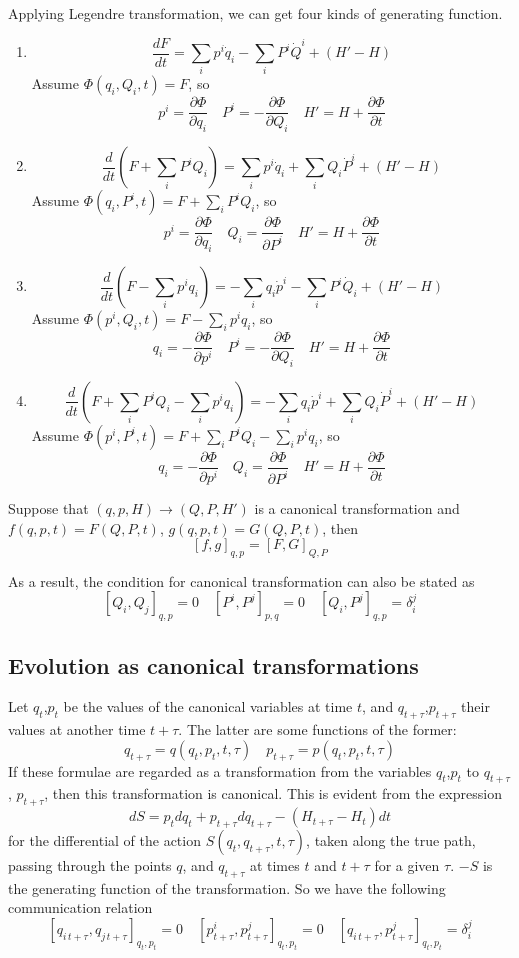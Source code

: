 \documentclass[cyan]{elegantnote}
\begin{document}
Applying Legendre transformation, we can get four kinds of generating function. 
\begin{enumerate}
\item \[\frac{dF}{dt} = \sum_i p^i \dot{q}_i - \sum_i P^i \dot{Q}^i + (H'-H)\]
Assume $\Phi(q_i,Q_i,t) = F$, so
\[p^i = \frac{\partial \Phi}{\partial q_i} \quad P^i = -\frac{\partial \Phi}{\partial Q_i} \quad H' = H + \frac{\partial \Phi}{\partial t}\]

\item \[\frac{d}{dt}(F+\sum_i P^i Q_i) = \sum_i p^i \dot{q}_i + \sum_i Q_i \dot{P}^i + (H'-H)\]
Assume $\Phi(q_i,P^i,t) = F + \sum_i P^i Q_i$, so
\[p^i = \frac{\partial \Phi}{\partial q_i} \quad Q_i = \frac{\partial \Phi}{\partial P^i} \quad H' = H + \frac{\partial \Phi}{\partial t}\]

\item \[\frac{d}{dt}(F-\sum_i p^i q_i) = -\sum_i q_i \dot{p}^i - \sum_i P^i \dot{Q}_i + (H'-H)\]
Assume $\Phi(p^i,Q_i,t) = F - \sum_i p^i q_i$, so
\[q_i = -\frac{\partial \Phi}{\partial p^i} \quad P^i = -\frac{\partial \Phi}{\partial Q_i} \quad H' = H + \frac{\partial \Phi}{\partial t}\]

\item \[\frac{d}{dt}(F+\sum_i P^i Q_i-\sum_i p^i q_i) = -\sum_i q_i \dot{p}^i + \sum_i Q_i \dot{P}^i + (H'-H)\]
Assume $\Phi(p^i,P^i,t) = F+\sum_i P^i Q_i-\sum_i p^i q_i$, so
\[q_i = -\frac{\partial \Phi}{\partial p^i} \quad Q_i = \frac{\partial \Phi}{\partial P^i} \quad H' = H + \frac{\partial \Phi}{\partial t}\]
\end{enumerate}

\begin{newthem}
Suppose that $(q,p,H) \to (Q,P,H')$ is a canonical transformation and $f(q,p,t) = F(Q,P,t)$, $g(q,p,t) = G(Q,P,t)$, then
\[[f,g]_{q,p} = [F,G]_{Q,P}\]
\end{newthem}
As a result, the condition for canonical transformation can also be stated as
\[[Q_i,Q_j]_{q,p} = 0 \quad [P^i,P^j]_{p,q} = 0 \quad [Q_i,P^j]_{q,p} = \delta_i^j\]

\subsection{Evolution as canonical transformations}
Let $q_t$,$p_t$ be the values of the canonical variables at time $t$, and $q_{t+\tau}$,$p_{t+\tau}$ their values at another time $t+\tau$. The latter are some functions of the former:
\[q_{t+\tau} = q(q_t,p_t,t,\tau) \quad p_{t+\tau} = p(q_t,p_t,t,\tau)\]
If these formulae are regarded as a transformation from the variables $q_t$,$p_t$ to $q_{t+\tau}$, $p_{t+\tau}$, then this transformation is canonical. This is evident from the
expression
\[dS = p_t dq_t + p_{t+\tau} dq_{t+\tau} -(H_{t+\tau}-H_t)dt\]
for the differential of the action $S(q_t,q_{t+\tau},t,\tau)$, taken along the true path, passing through the points $q$, and $q_{t+\tau}$ at times $t$ and $t+\tau$ for a given $\tau$. $-S$ is the generating function of the transformation. So we have the following communication relation
\[[q_{i\,t+\tau},q_{j\,t+\tau}]_{q_t,p_t} = 0 \quad [p^i_{t+\tau},p^j_{t+\tau}]_{q_t,p_t} = 0 \quad [q_{i\,t+\tau},p^j_{t+\tau}]_{q_t,p_t} = \delta_i^j\]
\end{document}
